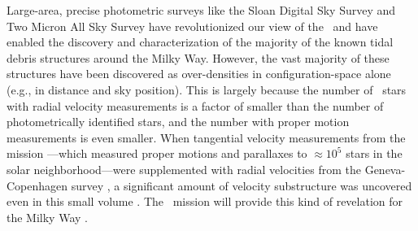 Large-area, precise photometric surveys like the Sloan Digital Sky Survey
\citep[SDSS;][]{york00} and Two Micron All Sky Survey
\citep[2MASS;][]{skrutskie06} have revolutionized our view of the \mwhalo\ and
have enabled the discovery and characterization of the majority of the known
tidal debris structures around the Milky Way. However, the vast majority of
these structures have been discovered as over-densities in configuration-space
alone (e.g., in distance and sky position). This is largely because the number
of \mwhalo\ stars with radial velocity measurements is a factor of 
smaller than the number of photometrically identified stars, and the number with
proper motion measurements is even smaller. When tangential velocity
measurements from the  mission \citep{perryman97}---which
measured proper motions and parallaxes to $\approx$$10^5$ stars in the solar
neighborhood---were supplemented with radial velocities from the Geneva-
Copenhagen survey \citep{nordstrom04}, a significant amount of velocity
substructure was uncovered even in this small volume \citep[e.g.,][]{bovy09,
minchev10}. The \gaia\ mission will provide this kind of revelation for the
Milky Way \mwhalo.

\begin{figure}[h]
\centering
\caption{}
\label{fig:gaia-stellar-pops}
\end{figure}

